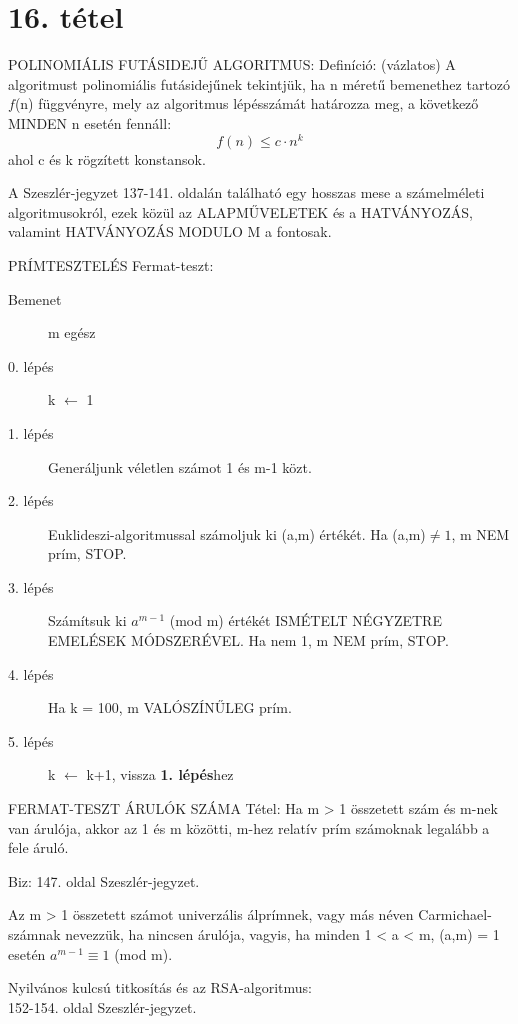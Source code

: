 \section{16. tétel}

\begin{shaded}
POLINOMIÁLIS FUTÁSIDEJŰ ALGORITMUS: Definíció: (vázlatos) A algoritmust polinomiális futásidejűnek tekintjük, ha n méretű bemenethez tartozó $f$(n) függvényre, mely az algoritmus lépésszámát határozza meg, a következő MINDEN n esetén fennáll:
$$f(n) \leq c\cdot n^k$$ ahol c és k rögzített konstansok.
\end{shaded}
A Szeszlér-jegyzet 137-141. oldalán található egy hosszas mese a számelméleti algoritmusokról, ezek közül az ALAPMŰVELETEK és a HATVÁNYOZÁS, valamint HATVÁNYOZÁS MODULO M a fontosak.
\begin{framed}
PRÍMTESZTELÉS Fermat-teszt:
\begin{description}
\item[Bemenet]m egész
\item[0. lépés]k $\leftarrow$ 1
\item[1. lépés]Generáljunk véletlen számot 1 és m-1 közt.
\item[2. lépés]Euklideszi-algoritmussal számoljuk ki (a,m) értékét. Ha (a,m)$\neq1$, m NEM prím, STOP.
\item[3. lépés]Számítsuk ki $a^{m-1}$ (mod m) értékét ISMÉTELT NÉGYZETRE EMELÉSEK MÓDSZERÉVEL. Ha nem 1, m NEM prím, STOP.
\item[4. lépés]Ha k = 100, m VALÓSZÍNŰLEG prím.
\item[5. lépés]k $\leftarrow$ k+1, vissza \textbf{1. lépés}hez
\end{description}
\end{framed}
\begin{framed}
FERMAT-TESZT ÁRULÓK SZÁMA Tétel: Ha m > 1 összetett szám és m-nek van árulója, akkor az 1 és m közötti, m-hez relatív prím számoknak legalább a fele áruló.
\end{framed}
\begin{leftbar}
Biz: 147. oldal Szeszlér-jegyzet.
\end{leftbar}
\begin{shaded}
Az m > 1 összetett számot univerzális álprímnek, vagy más néven Carmichael-számnak nevezzük, ha nincsen árulója, vagyis, ha minden 1 < a < m, (a,m) = 1 esetén $a^{m-1} \equiv 1$ (mod m).
\end{shaded}
Nyilvános kulcsú titkosítás és az RSA-algoritmus:\\
152-154. oldal Szeszlér-jegyzet.

